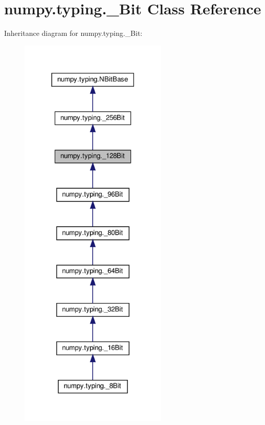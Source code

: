 \hypertarget{classnumpy_1_1typing_1_1__128Bit}{}\section{numpy.\+typing.\+\_\+Bit Class Reference}
\label{classnumpy_1_1typing_1_1__128Bit}


Inheritance diagram for numpy.\+typing.\+\_\+Bit\+:
\nopagebreak
\begin{figure}[H]
\begin{center}
\leavevmode
\includegraphics[width=200pt]{classnumpy_1_1typing_1_1__128Bit__inherit__graph}
\end{center}
\end{figure}


